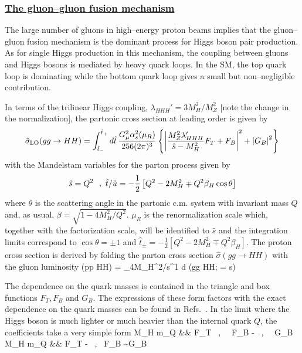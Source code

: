 \subsubsection*{\underline{The gluon--gluon fusion mechanism}}

The large number of gluons in high--energy proton beams implies that the
gluon--gluon fusion mechanism is the dominant process for Higgs boson pair
production. As for single Higgs production in this mechanism, the coupling
between gluons and Higgs bosons is mediated by heavy quark loops. In the SM, 
the top quark loop is dominating while the bottom quark loop gives a small
but non--negligible contribution. \s

In terms of the  trilinear Higgs coupling, $\lambda_{HHH}'=3M_H^2/M_Z^2$ [note 
the change in the normalization], the partonic cross section at leading order 
is given by \cite{pp-ggHH-LO1}
\begin{equation}
\hat \sigma_{\rm LO}(gg \to HH) = \int_{\hat t_-}^{\hat t_+} d\hat t \,
\frac{G_\mu^2 \alpha_s^2(\mu_R)}{256 (2\pi)^3} \left\{ \left| \frac{M_Z^2  
\lambda_{HHH}'}{\hat s - M_H^2}F_T + F_B \right|^2 + \left|G_B \right|^2 
\right\}
\end{equation}
with the Mandelstam variables for the parton process given by
\begin{equation}
\hat s = Q^2 \ \ , \ 
\hat t /\hat u  = - {\footnotesize 1 \over 2} \left[Q^2-2M_H^2 \mp Q^2 \beta_H 
\cos\theta \right]
\end{equation}
where $\theta$ is the scattering angle in the partonic c.m. system with 
invariant mass $Q$ and, as usual, $\beta= \sqrt{1-4M_H^2/Q^2}$. $\mu_R$ is the 
renormalization scale which, together with the factorization scale, will be 
identified to $\hat{s}$ and the integration limits correspond to 
$\cos\theta=\pm 1$ and $\hat  t_\pm = -\frac{1}{2} \left[ Q^2 - 2 M_H^2 \mp 
Q^2 \beta_H \right]$.
The proton cross section is derived by folding the parton cross section 
$\hat{\sigma}(gg\to HH)$ with the gluon luminosity
\beq
\sigma (pp \to HH) = \int_{4M_H^2/s}^1 d\tau 
{} \hat{\sigma} (gg \to HH;  = \tau s)
\eeq

The dependence on the quark masses is contained in the triangle and box 
functions $F_T, F_B$ and $G_B$.  The expressions of these form factors 
with the exact dependence on the quark masses can be found in 
Refs.~\cite{pp-ggHH-LO,pp-ggHH-LO1}. In the limit where the Higgs boson is much 
lighter or much heavier than the internal quark $Q$, the coefficients take a 
very simple form \cite{pp-ggHH-LO1}
\beq
M_H  m_Q && F_T \simeq {}\ , \ \  F_B \simeq - \ , 
\ \ G_B \simeq 0 \non \\
M_H  m_Q && F_T \simeq 
-  \ , \ 
F_B \sim G_B 
\eeq

